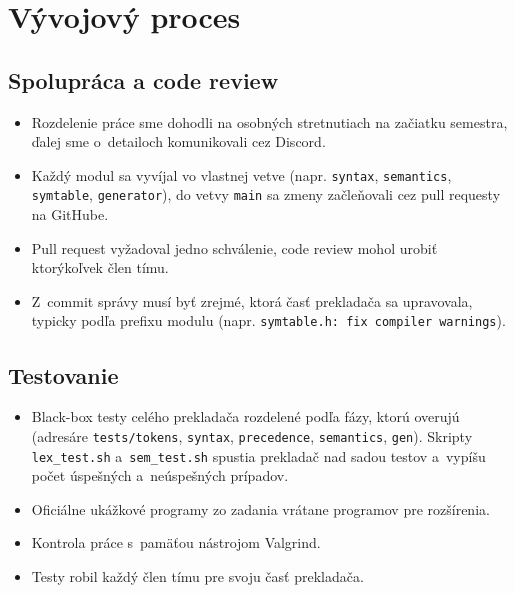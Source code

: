 \documentclass[11pt,a4paper]{article}
\begin{document}
\section{Vývojový proces}

\subsection{Spolupráca a code review}
\begin{itemize}
  \item Rozdelenie práce sme dohodli na osobných stretnutiach na začiatku
        semestra, ďalej sme o~detailoch komunikovali cez Discord.
  \item Každý modul sa vyvíjal vo vlastnej vetve (napr. \texttt{syntax},
        \texttt{semantics}, \texttt{symtable}, \texttt{generator}),
        do vetvy \texttt{main} sa zmeny začleňovali cez pull requesty na GitHube.
  \item Pull request vyžadoval jedno schválenie, code review mohol urobiť
        ktorýkoľvek člen tímu.
  \item Z~commit správy musí byť zrejmé, ktorá časť prekladača sa upravovala,
        typicky podľa prefixu modulu (napr. \texttt{symtable.h: fix compiler warnings}).
\end{itemize}

\subsection{Testovanie}
\begin{itemize}
  \item Black-box testy celého prekladača rozdelené podľa fázy, ktorú overujú
        (adresáre \texttt{tests/tokens}, \texttt{syntax}, \texttt{precedence},
        \texttt{semantics}, \texttt{gen}). Skripty \texttt{lex\_test.sh}
        a~\texttt{sem\_test.sh} spustia prekladač nad sadou testov a~vypíšu
        počet úspešných a~neúspešných prípadov.
  \item Oficiálne ukážkové programy zo zadania vrátane programov pre rozšírenia.
  \item Kontrola práce s~pamäťou nástrojom Valgrind.
  \item Testy robil každý člen tímu pre svoju časť prekladača.
\end{itemize}
\end{document}
